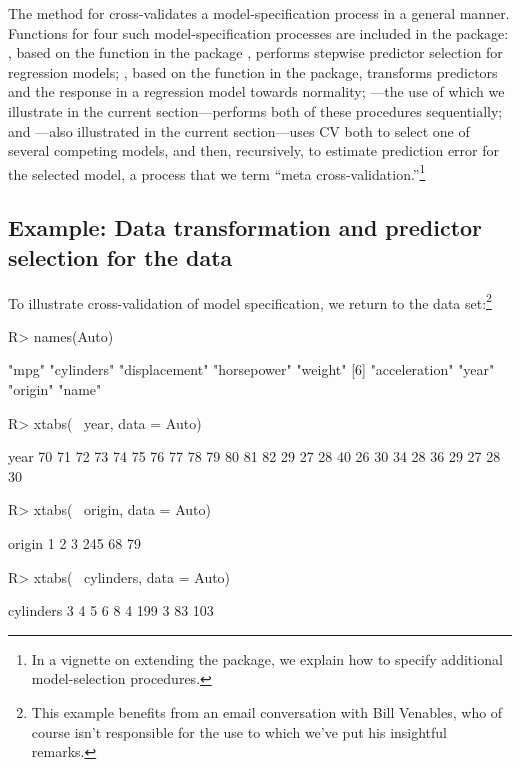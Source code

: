 \documentclass[
]{jss}
\begin{document}
The  method for  cross-validates a
model-specification process in a general manner. Functions for four such
model-specification processes are included in the package:
, based on the  function in the
 package \citep{VenablesRipley:2002}, performs stepwise
predictor selection for regression models; , based
on the  function in the  package,
transforms predictors and the response in a regression model towards
normality; ---the use of which we illustrate
in the current section---performs both of these procedures sequentially;
and ---also illustrated in the current
section---uses CV both to select one of several competing models, and
then, recursively, to estimate prediction error for the selected model,
a process that we term ``meta cross-validation.''\footnote{In a vignette
  on extending the  package, we explain how to specify
  additional model-selection procedures.}

\subsection[Example: Data transformation and predictor selection for the Auto
data]{Example: Data transformation and predictor selection for the
data}\label{example-data-transformation-and-predictor-selection-for-the-auto-data}

To illustrate cross-validation of model specification, we return to the
 data set:\footnote{This example benefits from an email
  conversation with Bill Venables, who of course isn't responsible for
  the use to which we've put his insightful remarks.}

\begin{CodeChunk}
\begin{CodeInput}
R> names(Auto)
\end{CodeInput}
\begin{CodeOutput}
[1] "mpg"          "cylinders"    "displacement" "horsepower"   "weight"
[6] "acceleration" "year"         "origin"       "name"
\end{CodeOutput}
\begin{CodeInput}
R> xtabs(~ year, data = Auto)
\end{CodeInput}
\begin{CodeOutput}
year
70 71 72 73 74 75 76 77 78 79 80 81 82
29 27 28 40 26 30 34 28 36 29 27 28 30
\end{CodeOutput}
\begin{CodeInput}
R> xtabs(~ origin, data = Auto)
\end{CodeInput}
\begin{CodeOutput}
origin
  1   2   3
245  68  79
\end{CodeOutput}
\begin{CodeInput}
R> xtabs(~ cylinders, data = Auto)
\end{CodeInput}
\begin{CodeOutput}
cylinders
  3   4   5   6   8
  4 199   3  83 103
\end{CodeOutput}
\end{CodeChunk}
\end{document}
